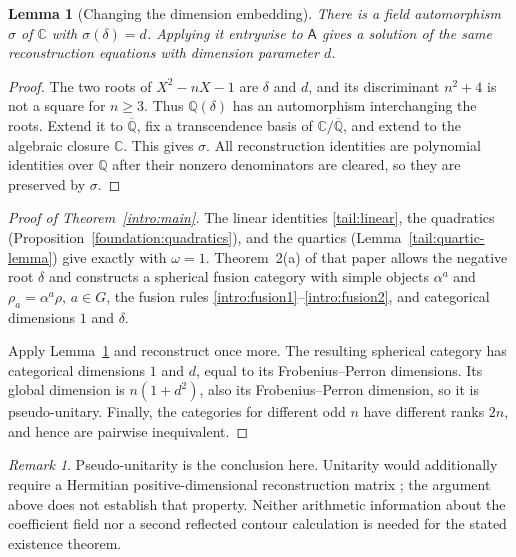 \documentclass[11pt]{article}
\numberwithin{equation}{section}
\newtheorem{lemma}[theorem]{Lemma}
\theoremstyle{definition}
\theoremstyle{remark}
\newtheorem{remark}[theorem]{Remark}
\newcommand{\Q}{\mathbb Q}
\newcommand{\C}{\mathbb C}
\begin{document}
\begin{lemma}[Changing the dimension embedding]\label{tail:embedding}
There is a field automorphism $\sigma$ of $\C$ with $\sigma(\delta)=d$.
Applying it entrywise to $\mathsf A$ gives a solution of the same
reconstruction equations with dimension parameter $d$.
\end{lemma}

\begin{proof}
The two roots of $X^2-nX-1$ are $\delta$ and $d$, and its
discriminant $n^2+4$ is not a square for $n\ge3$.
Thus $\Q(\delta)$ has an automorphism interchanging the roots.
Extend it to $\overline{\Q}$, fix a transcendence basis of
$\C/\overline{\Q}$, and extend to the algebraic closure $\C$.
This gives $\sigma$. All reconstruction identities are polynomial
identities over $\Q$ after their nonzero denominators are cleared,
so they are preserved by $\sigma$.
\end{proof}

\begin{proof}[Proof of Theorem~\ref{intro:main}]
The linear identities \eqref{tail:linear}, the quadratics
(Proposition~\ref{foundation:quadratics}), and the quartics
(Lemma~\ref{tail:quartic-lemma}) give exactly
\cite[Eqs.~(4.7)--(4.10)]{EG} with $\omega=1$.
Theorem~2(a) of that paper allows the negative root $\delta$ and
constructs a spherical fusion category with simple objects
$\alpha^a$ and $\rho_a=\alpha^a\rho$, $a\in G$,
the fusion rules \eqref{intro:fusion1}--\eqref{intro:fusion2}, and
categorical dimensions $1$ and $\delta$.

Apply Lemma~\ref{tail:embedding} and reconstruct once more.
The resulting spherical category has categorical dimensions $1$ and $d$,
equal to its Frobenius--Perron dimensions. Its global dimension is
$n(1+d^2)$, also its Frobenius--Perron dimension, so it is pseudo-unitary.
Finally, the categories for different odd $n$ have different ranks $2n$,
and hence are pairwise inequivalent.
\end{proof}

\begin{remark}
Pseudo-unitarity is the conclusion here. Unitarity would additionally
require a Hermitian positive-dimensional reconstruction matrix
\cite[Theorem~2(c)]{EG}; the argument above does not establish that
property. Neither arithmetic information about the coefficient field
nor a second reflected contour calculation is needed for the stated
existence theorem.
\end{remark}
\end{document}

